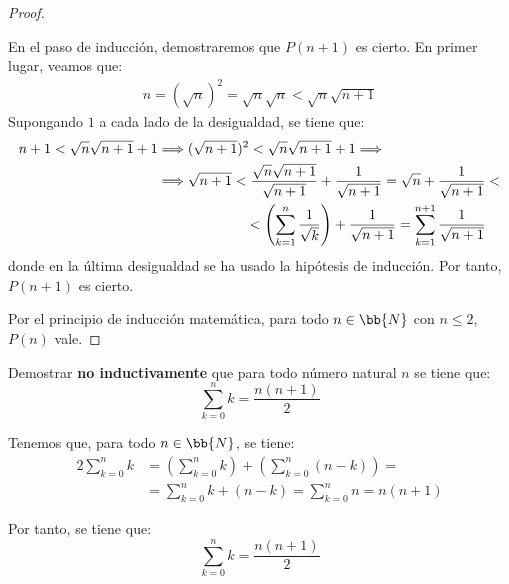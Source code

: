 \begin{ejercicio}
\begin{proof}
\begin{itemize}
        En el paso de inducción, demostraremos que $P(n+1)$ es cierto. En primer lugar, veamos que:
        \begin{align*}
            n = (\sqrt{n})^2 = \sqrt{n}\sqrt{n} < \sqrt{n}\sqrt{n+1}
        \end{align*}
        Supongando $1$ a cada lado de la desigualdad, se tiene que:
        \begin{align*}
            n+1 < \sqrt{n}\sqrt{n+1} +1 
            &\Longrightarrow (\sqrt{n+1})^2 < \sqrt{n}\sqrt{n+1}+1
            \Longrightarrow\\ &\Longrightarrow \sqrt{n+1} < \dfrac{\sqrt{n}\sqrt{n+1}}{\sqrt{n+1}}+\dfrac{1}{\sqrt{n+1}}
                           =\sqrt{n}+\dfrac{1}{\sqrt{n+1}}<\\
                           &\hspace{2.22cm} <\left( \sum_{k=1}^n \dfrac{1}{\sqrt{k}}\right)+\dfrac{1}{\sqrt{n+1}}
                           =\sum_{k=1}^{n+1} \dfrac{1}{\sqrt{n+1}}
        \end{align*}
        donde en la última desigualdad se ha usado la hipótesis de inducción. Por tanto, $P(n+1)$ es cierto.
    \end{itemize}
    Por el principio de inducción matemática, para todo $n \in \bb{N}$ con $n \leq 2$, $P(n)$ vale.
\end{proof}
\end{ejercicio}



\begin{ejercicio}
    Demostrar \textbf{no inductivamente} que para todo número natural $n$ se tiene que:
    \begin{equation*}
        \sum_{k=0}^n k = \dfrac{n(n+1)}{2}
    \end{equation*}

    Tenemos que, para todo $n\in \bb{N}$, se tiene:
    \begin{align*}
        2 \sum_{k=0}^n k &=\left(\sum_{k=0}^n k\right) + \left(\sum_{k=0}^n (n-k)\right) =\\
        &= \sum_{k=0}^n k + (n-k)
        = \sum_{k=0}^n n = n(n+1)
    \end{align*}

    Por tanto, se tiene que:
    \begin{equation*}
        \sum_{k=0}^n k = \dfrac{n(n+1)}{2}
    \end{equation*}
\end{ejercicio}


